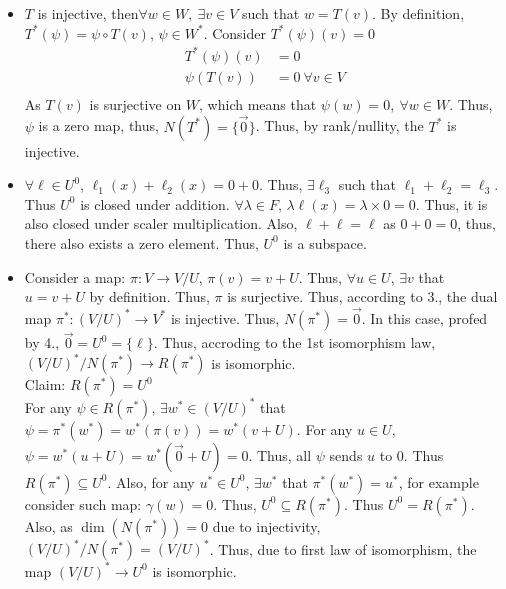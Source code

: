 \documentclass{article}
\begin{document}
\begin{itemize}
\begin{itemize}
\begin{align*}
\begin{pmatrix}
            \end{pmatrix},
            \begin{pmatrix}
                0&0&0\\
                0&0&0\\
                0&0&1
            \end{pmatrix}
            \right\}
        \end{align*}
    \end{itemize}
    \item [3.] \(T\) is injective, then\(\forall w\in W,\ \exists v\in V\) such that \(w=T(v)\). By definition, 
    \(T^*(\psi) =\psi\circ T (v) \), \(\psi\in W^*\). Consider \(T^*(\psi)(v) = 0\)
    \begin{align*}
        T^*(\psi)(v) &= 0\\
        \psi(T(v))&=0 \ \forall v\in V\\
    \end{align*}
    As \(T(v)\) is surjective on \(W\), which means that \(\psi(w)=0,\ \forall w\in W\). Thus, \(\psi\) is a zero map, thus, \(N(T^*) = \{\overrightarrow{0}\}\). Thus, by rank/nullity, the \(T^*\) is injective.
    \item [4.]\(\forall \ell\in U^0\), \(\ell_1(x)+\ell_2(x) = 0+0\). Thus, \(\exists \ell_3\) such that \(\ell_1+\ell_2=\ell_3\). Thus \(U^0\) is closed under addition.
              \(\forall \lambda\in F\), \(\lambda \ell(x)=\lambda\times 0 = 0\). Thus, it is also closed under scaler multiplication. Also, \(\ell+\ell=\ell\) as \(0+0=0\), thus, there also exists a zero element. Thus, \(U^0\) is a subspace.
    \item [5.]Consider a map: \(\pi:V\rightarrow V/U\), \(\pi(v)=v+U\). Thus, \(\forall u\in U\), \(\exists v\) that \(u=v+U\) by definition. Thus, \(\pi\) is surjective. Thus, according to 3., the dual map \(\pi^*:(V/U)^*\rightarrow V^*\) is injective. 
    Thus, \(N(\pi^*)={\overrightarrow{0}}\). In this case, profed by 4., \(\overrightarrow{0}=U^0=\{\ell\}\). Thus, accroding to the 1st isomorphism law,
    \({(V/U)^*}/{N(\pi^*)}\rightarrow R(\pi^*)\) is isomorphic.\\
    Claim: \(R(\pi^*)=U^0\)\\
    For any \(\psi \in R(\pi^*)\), \(\exists w^*\in (V/U)^*\) that\\
    \(\psi=\pi^*(w^*)=w^*(\pi(v))=w^*(v+U)\). For any \(u\in U\), \(\psi = w^*(u+U)=w^*(\overrightarrow{0}+U)=0\). Thus, all \(\psi\) sends \(u\) to 0. Thus \(R(\pi^*)\subseteq U^0\). 
    Also, for any \(u^*\in U^0\), \(\exists w^*\) that \(\pi^*(w^*)=u^*\), for example consider such map: \(\gamma(w)=0\). Thus, \(U^0\subseteq R(\pi^*)\). Thus \(U^0=R(\pi^*)\). Also, as \(\dim(N(\pi^*))=0\) due to injectivity, \((V/U)^*/N(\pi^*)=(V/U)^*\). Thus, due to first law of isomorphism, the map \((V/U)^*\rightarrow U^0\) is isomorphic.

\end{itemize}
\end{document}
